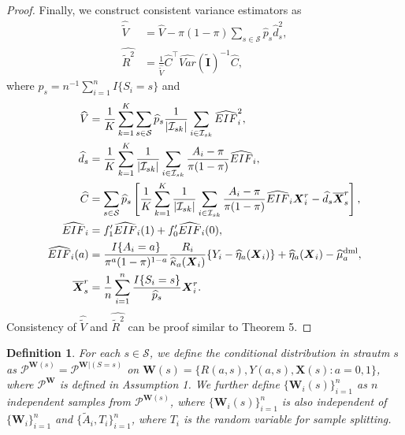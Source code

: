 \documentclass[12pt]{article}
\newtheorem{definition}{Definition}
\newcommand{\bX}{\boldsymbol{X}}
\newcommand{\bW}{\boldsymbol{W}}
\newcommand{\bI}{\boldsymbol{I}}
\newcommand{\tA}{\widetilde{A}}
\begin{document}
\begin{proof}
Finally, we construct consistent variance estimators as
\begin{align}
       \widehat{\widetilde{V}} &= \widehat{V} - \pi(1-\pi) \sum_{s \in \mathcal{S}} \widehat{p}_s \widehat{d}_s^2, \label{vhat: ml-st}\\
    \widehat{\widetilde{R}^2} &= \frac{1}{\widehat{\widetilde{V}}} \widehat{C}^\top \widehat{Var}(\widetilde{\bI})^{-1} \widehat{C},\label{R2hat: ml-st}
\end{align}
where $\widehat{p}_s = n^{-1}\sum_{i=1}^n I\{S_i=s\}$ and
\begin{align*}
    \widehat{V} &= \frac{1}{K}\sum_{k=1}^K \sum_{s \in \mathcal{S}} \widehat{p}_s\frac{1}{|\mathcal{I}_{sk}|} \sum_{i \in \mathcal{I}_{sk}} \widehat{EIF}_{i}^2, \\
    \widehat{d}_s &= \frac{1}{K}\sum_{k=1}^K \frac{1}{|\mathcal{I}_{sk}|}\sum_{i \in \mathcal{I}_{sk}}\frac{A_i-\pi}{\pi(1-\pi)}  \widehat{EIF}_i, \\
    \widehat{C} &=  \sum_{s \in \mathcal{S}} \widehat{p}_s \left[ \frac{1}{K}\sum_{k=1}^K \frac{1}{|\mathcal{I}_{sk}|}\sum_{i \in \mathcal{I}_{sk}}\frac{A_i-\pi}{\pi(1-\pi)}  \widehat{EIF}_i\bX_i^r -\widehat{d}_s\overline{\bX}_s^r \right], \\
    \widehat{EIF}_i &= f_1'\widehat{EIF}_i(1) + f_0'\widehat{EIF}_i(0), \\
    \widehat{EIF}_i(a) &= \frac{I\{A_i=a\}}{\pi^a(1-\pi)^{1-a}}\frac{R_i}{\widehat{\kappa}_a(\bX_i)}\{Y_i - \widehat{\eta}_a(\bX_i)\} + \widehat{\eta}_a(\bX_i)-\widehat{\mu}_a^{\textup{dml}},\\
    \overline{\bX}_s^r &= \frac{1}{n} \sum_{i=1}^n \frac{I\{S_i=s\}} {\widehat{p}_s}\bX_i^r. 
\end{align*}
Consistency of $\widehat{\widetilde{V}}$ and $\widehat{\widetilde{R}^2}$ can be proof similar to Theorem 5.
\end{proof}


\begin{definition}\label{def: conditional-W}
    For each $s \in \mathcal{S}$, we define the conditional distribution in strautm $s$ as $\mathcal{P}^{\bW(s)} = \mathcal{P}^{\bW|(S=s)}$ on $\bW(s) = \{R(a,s), Y(a,s), \bX(s): a = 0,1\}$, where $\mathcal{P}^{\bW}$ is defined in Assumption 1. We further define $\{\bW_i(s)\}_{i=1}^n$ as $n$ independent samples from $\mathcal{P}^{\bW(s)}$, where $\{\bW_i(s)\}_{i=1}^n$ is also independent of $\{\bW_i\}_{i=1}^n$ and $\{\tA_i, T_i\}_{i=1}^n$, where $T_i$ is the random variable for sample splitting.
\end{definition}
\end{document}
